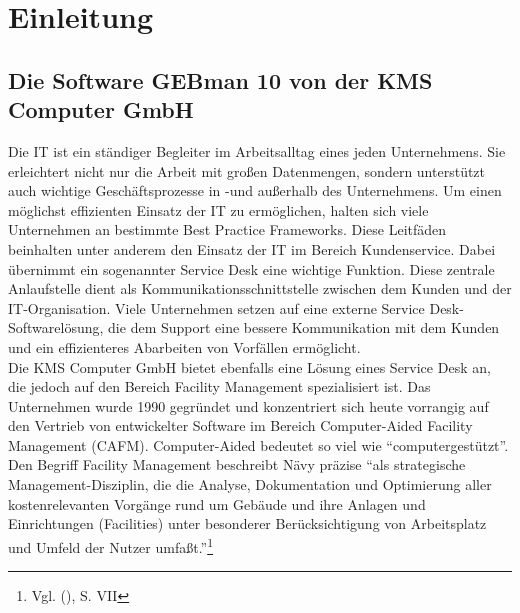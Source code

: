 \section{Einleitung}


\subsection{Die Software GEBman 10 von der KMS Computer GmbH}
\noindent
Die IT ist ein ständiger Begleiter im Arbeitsalltag eines jeden Unternehmens. Sie erleichtert nicht nur die Arbeit mit großen Datenmengen, sondern unterstützt auch wichtige Geschäftsprozesse in -und außerhalb des Unternehmens. Um einen möglichst effizienten Einsatz der IT zu ermöglichen, halten sich viele Unternehmen an bestimmte Best Practice Frameworks. Diese Leitfäden beinhalten unter anderem den Einsatz der IT im Bereich Kundenservice. Dabei übernimmt ein sogenannter Service Desk eine wichtige Funktion. Diese zentrale Anlaufstelle dient als Kommunikationsschnittstelle zwischen dem Kunden und der IT-Organisation. Viele Unternehmen setzen auf eine externe Service Desk-Softwarelösung, die dem Support eine bessere Kommunikation mit dem Kunden und ein effizienteres Abarbeiten von Vorfällen ermöglicht.\\

\noindent
Die KMS Computer GmbH bietet ebenfalls eine Lösung eines Service Desk an, die jedoch auf den Bereich Facility Management spezialisiert ist. Das Unternehmen wurde 1990 gegründet und konzentriert sich heute vorrangig auf den Vertrieb von entwickelter Software im Bereich Computer-Aided Facility Management (CAFM). Computer-Aided bedeutet so viel wie \enquote{computergestützt}. Den Begriff Facility Management beschreibt Nävy präzise \enquote{als strategische Management-Disziplin, die die Analyse, Dokumentation und Optimierung aller kostenrelevanten Vorgänge rund um Gebäude und ihre Anlagen und Einrichtungen (Facilities) unter besonderer Berücksichtigung von Arbeitsplatz und Umfeld der Nutzer umfaßt.}\footnote{Vgl. \citeauthor{Naevy} (\citeyear{Naevy}), S. VII}\\

